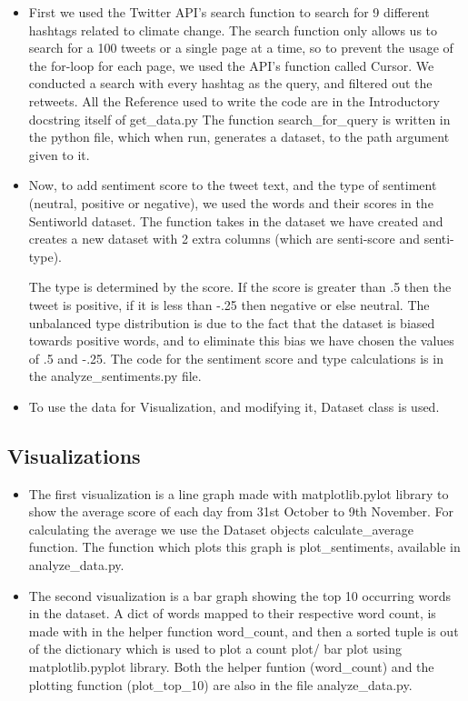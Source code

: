 \documentclass[a4paper, 11pt]{report}
\begin{document}
\begin{itemize}
    \item First we used the Twitter API's search function to search for 9 different hashtags related to climate change. The search function only allows us to search for a 100 tweets or a single page at a time, so to prevent the usage of the for-loop for each page, we used the API's function called Cursor. We conducted a search with every hashtag as the query, and filtered out the retweets. All the Reference used to write the code are in the Introductory docstring itself of get\_data.py The function search\_for\_query is written in the python file, which when run, generates a dataset, to the path argument given to it.

    \item Now, to add sentiment score to the tweet text, and the type of sentiment (neutral, positive or negative), we used the words and their scores in the Sentiworld dataset. The function takes in the dataset we have  created and creates a new dataset with 2 extra columns (which are senti-score and senti-type).

    The type is determined by the score. If the score is greater than .5 then the tweet is positive, if it is less than -.25 then negative or else neutral. The unbalanced type distribution is due to the fact that the dataset is biased towards positive words, and to eliminate this bias we have chosen the values of .5 and -.25. The code for the sentiment score and type calculations is in the analyze\_sentiments.py file.

    \item To use the data for Visualization, and modifying it, Dataset class is used.

\end{itemize}


\subsection{Visualizations}

\begin{itemize}
    \item The first visualization is a line graph made with matplotlib.pylot library to show the average score of each day from 31st October to 9th November. For calculating the average we use the Dataset objects calculate\_average function. The function which plots this graph is plot\_sentiments, available in analyze\_data.py.

    \item The second visualization is a bar graph showing the top 10 occurring words in the dataset. A dict of words mapped to their respective word count, is made with in the helper function word\_count, and then a sorted tuple is out of the dictionary which is used to plot a count plot/ bar plot using matplotlib.pyplot library. Both the helper funtion (word\_count) and the plotting function (plot\_top\_10) are also in the file analyze\_data.py.
\end{itemize}
\end{document}
